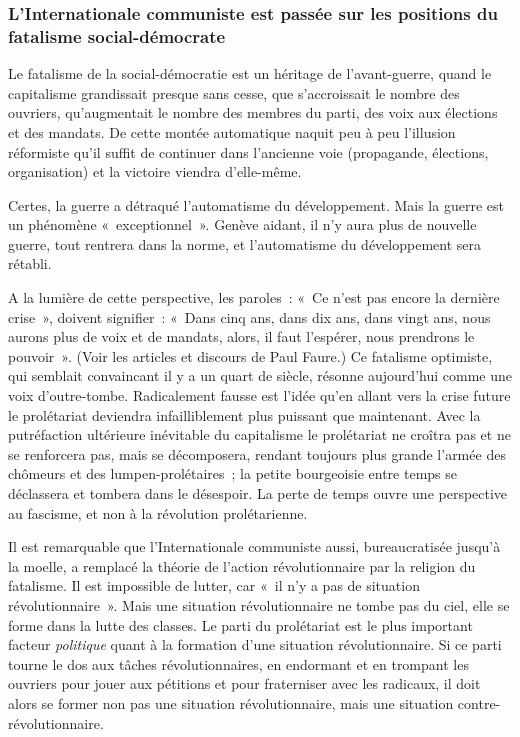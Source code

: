 \documentclass[french,twoside]{book} %
\begin{document}
 \subsubsection[{L’Internationale communiste est passée sur les positions du fatalisme social-démocrate}]{L’Internationale communiste est passée sur les positions du fatalisme social-démocrate}
\noindent Le fatalisme de la social-démocratie est un héritage de l’avant-guerre, quand le capitalisme grandissait presque sans cesse, que s’accroissait le nombre des ouvriers, qu’augmentait le nombre des membres du parti, des voix aux élections et des mandats. De cette montée automatique naquit peu à peu l’illusion réformiste qu’il suffit de continuer dans l’ancienne voie (propagande, élections, organisation) et la victoire viendra d’elle-même.\par
Certes, la guerre a détraqué l’automatisme du développement. Mais la guerre est un phénomène « exceptionnel ». Genève aidant, il n’y aura plus de nouvelle guerre, tout rentrera dans la norme, et l’automatisme du développement sera rétabli.\par
A la lumière de cette perspective, les paroles : « Ce n’est pas encore la dernière crise », doivent signifier : « Dans cinq ans, dans dix ans, dans vingt ans, nous aurons plus de voix et de mandats, alors, il faut l’espérer, nous prendrons le pouvoir ». (Voir les articles et discours de Paul Faure.) Ce fatalisme optimiste, qui semblait convaincant il y a un quart de siècle, résonne aujourd’hui comme une voix d’outre-tombe. Radicalement fausse est l’idée qu’en allant vers la crise future le prolétariat deviendra infailliblement plus puissant que maintenant. Avec la putréfaction ultérieure inévitable du capitalisme le prolétariat ne croîtra pas et ne se renforcera pas, mais se décomposera, rendant toujours plus grande l’armée des chômeurs et des lumpen-prolétaires ; la petite bourgeoisie entre temps se déclassera et tombera dans le désespoir. La perte de temps ouvre une perspective au fascisme, et non à la révolution prolétarienne.\par
Il est remarquable que l’Internationale communiste aussi, bureaucratisée jusqu’à la moelle, a remplacé la  théorie de l’action révolutionnaire par la religion du fatalisme. Il est impossible de lutter, car « il n’y a pas de situation révolutionnaire ». Mais une situation révolutionnaire ne tombe pas du ciel, elle se forme dans la lutte des classes. Le parti du prolétariat est le plus important facteur \emph{politique} quant à la formation d’une situation révolutionnaire. Si ce parti tourne le dos aux tâches révolutionnaires, en endormant et en trompant les ouvriers pour jouer aux pétitions et pour fraterniser avec les radicaux, il doit alors se former non pas une situation révolutionnaire, mais une situation contre-révolutionnaire.
\end{document}
